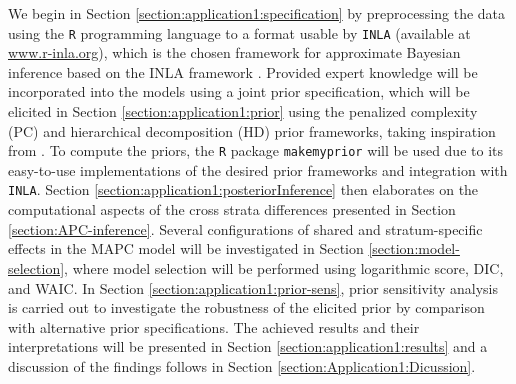 We begin in Section \ref{section:application1:specification} by preprocessing the data using the \texttt{R} programming language to a format usable by \texttt{INLA} (available at \href{www.r-inla.org}{www.r-inla.org}), which is the chosen framework for approximate Bayesian inference based on the INLA framework \citep{Original-INLA}. Provided expert knowledge will be incorporated into the models using a joint prior specification, which will be elicited in Section \ref{section:application1:prior} using the penalized complexity (PC) \citep{PC-priors} and hierarchical decomposition (HD) \citep{Jointprior} prior frameworks, taking inspiration from \cite{IngeborgGenetics}. To compute the priors, the \texttt{R} package \texttt{makemyprior} \citep{MMPPackage, MMP} will be used due to its easy-to-use implementations of the desired prior frameworks and integration with \texttt{INLA}. Section \ref{section:application1:posteriorInference} then elaborates on the computational aspects of the cross strata differences presented in Section \ref{section:APC-inference}. Several configurations of shared and stratum-specific effects in the MAPC model will be investigated in Section \ref{section:model-selection}, where model selection will be performed using logarithmic score, DIC, and WAIC. In Section \ref{section:application1:prior-sens}, prior sensitivity analysis is carried out to investigate the robustness of the elicited prior by comparison with alternative prior specifications. The achieved results and their interpretations will be presented in Section \ref{section:application1:results} and a discussion of the findings follows in Section \ref{section:Application1:Dicussion}. 


